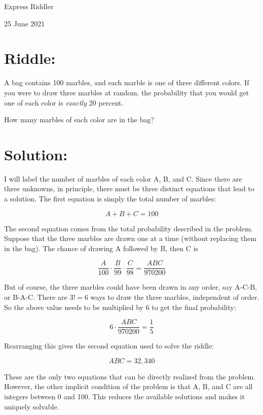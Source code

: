 \documentclass{article}
\begin{document}
\pagestyle{empty} %

\begin{center}
{\LARGE Express Riddler}

\vspace{0.15in}

{\Large 25 June 2021}
\end{center}


\section*{Riddle:}

A bag contains 100 marbles, and each marble is one of three different colors.
If you were to draw three marbles at random, the probability that you would get one of each color is \textit{exactly} 20 percent.

How many marbles of each color are in the bag?


\section*{Solution:}

I will label the number of marbles of each color A, B, and C.
Since there are three unknowns, in principle, there must be three distinct equations that lead to a solution.
The first equation is simply the total number of marbles:

\[
A+B+C=100
\]

The second equation comes from the total probability described in the problem.
Suppose that the three marbles are drawn one at a time (without replacing them in the bag).
The chance of drawing A followed by B, then C is

\[
\frac{A}{100}\cdot\frac{B}{99}\cdot\frac{C}{98}=\frac{ABC}{970200}
\]

But of course, the three marbles could have been drawn in any order, say A-C-B, or B-A-C.
There are $3!=6$ ways to draw the three marbles, independent of order.
So the above value needs to be multiplied by 6 to get the final probability:

\[
6\cdot\frac{ABC}{970200}=\frac{1}{5}
\]

Rearranging this gives the second equation used to solve the riddle:

\[
ABC=32,340
\]

These are the only two equations that can be directly realized from the problem.
However, the other implicit condition of the problem is that A, B, and C are all integers between 0 and 100.
This reduces the available solutions and makes it uniquely solvable.
\end{document}
